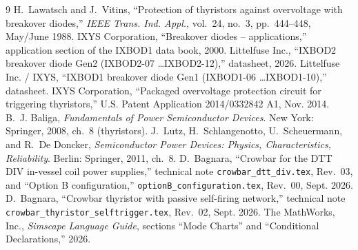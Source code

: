 \documentclass[11pt,a4paper]{article}
\newcommand{\ssc}[1]{\texttt{#1}}
\begin{document}
\begin{thebibliography}{9}
 H.~Lawatsch and J.~Vitins, ``Protection of thyristors against overvoltage with breakover diodes,'' \emph{IEEE Trans. Ind. Appl.}, vol.~24, no.~3, pp.~444--448, May/June 1988.
 IXYS Corporation, ``Breakover diodes -- applications,'' application section of the IXBOD1 data book, 2000.
 Littelfuse Inc., ``IXBOD2 breakover diode Gen2 (IXBOD2-07 \ldots IXBOD2-12),'' datasheet, 2026.
 Littelfuse Inc. / IXYS, ``IXBOD1 breakover diode Gen1 (IXBOD1-06 \ldots IXBOD1-10),'' datasheet.
 IXYS Corporation, ``Packaged overvoltage protection circuit for triggering thyristors,'' U.S. Patent Application 2014/0332842 A1, Nov. 2014.
 B.~J. Baliga, \emph{Fundamentals of Power Semiconductor Devices}. New York: Springer, 2008, ch.~8 (thyristors).
 J.~Lutz, H.~Schlangenotto, U.~Scheuermann, and R.~De Doncker, \emph{Semiconductor Power Devices: Physics, Characteristics, Reliability}. Berlin: Springer, 2011, ch.~8.
 D.~Bagnara, ``Crowbar for the DTT DIV in-vessel coil power supplies,'' technical note \ssc{crowbar\_dtt\_div.tex}, Rev.~03, and ``Option B configuration,'' \ssc{optionB\_configuration.tex}, Rev.~00, Sept. 2026.
 D.~Bagnara, ``Crowbar thyristor with passive self-firing network,'' technical note \ssc{crowbar\_thyristor\_selftrigger.tex}, Rev.~02, Sept. 2026.
 The MathWorks, Inc., \emph{Simscape Language Guide}, sections ``Mode Charts'' and ``Conditional Declarations,'' 2026.
\end{thebibliography}
\end{document}
